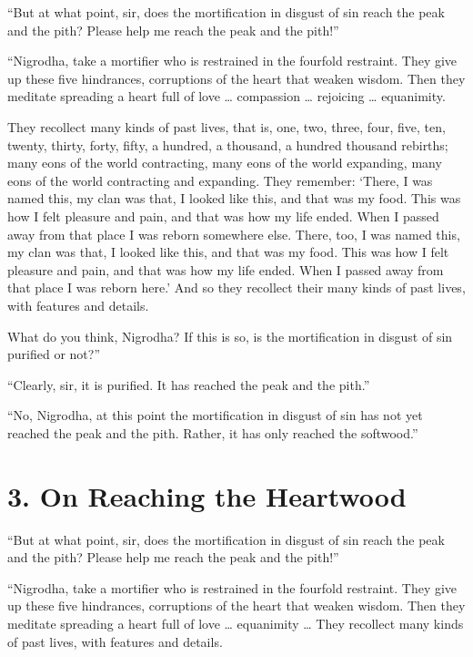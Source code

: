 \documentclass[12pt,openany]{book}%
\begin{document}
“But at what point, sir, does the mortification in disgust of sin reach the peak and the pith? Please help me reach the peak and the pith!” 

“Nigrodha, take a mortifier who is restrained in the fourfold restraint. They give up these five hindrances, corruptions of the heart that weaken wisdom. Then they meditate spreading a heart full of love … compassion … rejoicing … equanimity. 

They recollect many kinds of past lives, that is, one, two, three, four, five, ten, twenty, thirty, forty, fifty, a hundred, a thousand, a hundred thousand rebirths; many eons of the world contracting, many eons of the world expanding, many eons of the world contracting and expanding. They remember: ‘There, I was named this, my clan was that, I looked like this, and that was my food. This was how I felt pleasure and pain, and that was how my life ended. When I passed away from that place I was reborn somewhere else. There, too, I was named this, my clan was that, I looked like this, and that was my food. This was how I felt pleasure and pain, and that was how my life ended. When I passed away from that place I was reborn here.’ And so they recollect their many kinds of past lives, with features and details. 

What do you think, Nigrodha? If this is so, is the mortification in disgust of sin purified or not?” 

“Clearly, sir, it is purified. It has reached the peak and the pith.” 

“No, Nigrodha, at this point the mortification in disgust of sin has not yet reached the peak and the pith. Rather, it has only reached the softwood.” 

\section*{3. On Reaching the Heartwood }

“But at what point, sir, does the mortification in disgust of sin reach the peak and the pith? Please help me reach the peak and the pith!” 

“Nigrodha, take a mortifier who is restrained in the fourfold restraint. They give up these five hindrances, corruptions of the heart that weaken wisdom. Then they meditate spreading a heart full of love … equanimity … They recollect many kinds of past lives, with features and details. 
\end{document}
